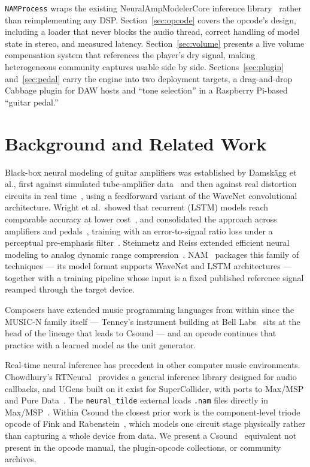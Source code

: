 \documentclass[sigconf,anonymous,review]{nimeart}
\begin{document}
\texttt{NAMProcess} wraps the existing NeuralAmpModelerCore inference
library~\cite{nam} rather than reimplementing any DSP.
Section~\ref{sec:opcode} covers the opcode's design, including a loader
that never blocks the audio thread, correct handling of model state in
stereo, and measured latency. Section~\ref{sec:volume} presents a live
volume compensation system that references the player's dry signal, making
heterogeneous community captures usable side by side.
Sections~\ref{sec:plugin} and~\ref{sec:pedal} carry the engine into two
deployment targets, a drag-and-drop Cabbage plugin for DAW hosts and
``tone selection'' in a Raspberry Pi-based ``guitar pedal.''

\section{Background and Related Work}

Black-box neural modeling of guitar amplifiers was established by
Damsk\"agg et al., first against simulated tube-amplifier
data~\cite{damskagg2019tube} and then against real distortion circuits in
real time~\cite{damskagg2019distortion}, using a feedforward variant of
the WaveNet convolutional architecture. Wright et al.\ showed that
recurrent (LSTM) models reach comparable accuracy at lower
cost~\cite{wright2019rnn}, and consolidated the approach across amplifiers
and pedals~\cite{wright2020realtime}, training with an error-to-signal
ratio loss under a perceptual pre-emphasis
filter~\cite{wright2020perceptual}. Steinmetz and Reiss extended efficient
neural modeling to analog dynamic range
compression~\cite{steinmetz2022compressor}. NAM~\cite{atkinson2025slimmable,
nam} packages this family of techniques --- its model format supports
WaveNet and LSTM architectures --- together with a training pipeline whose
input is a fixed published reference signal reamped through the target
device.

Composers have extended music programming languages from within since the
MUSIC-N family itself --- Tenney's instrument building at Bell
Labs~\cite{tenney1969cme} sits at the head of the lineage that leads to
Csound --- and an opcode continues that practice with a learned model as
the unit generator.

Real-time neural inference has precedent in other computer music
environments. Chowdhury's RTNeural~\cite{chowdhury2021rtneural} provides a
general inference library designed for audio callbacks, and UGens built on
it exist for SuperCollider, with ports to Max/MSP and Pure
Data~\cite{pluta_rtneural}. The \texttt{neural\_tilde} external loads
\texttt{.nam} files directly in Max/MSP~\cite{neuraltilde}. Within Csound
the closest prior work is the component-level triode opcode of Fink and
Rabenstein~\cite{fink2011triode}, which models one circuit stage
physically rather than capturing a whole device from data. We present a
Csound~\cite{lazzarini2016csound} equivalent not present in the opcode
manual, the plugin-opcode collections, or community archives.
\end{document}
